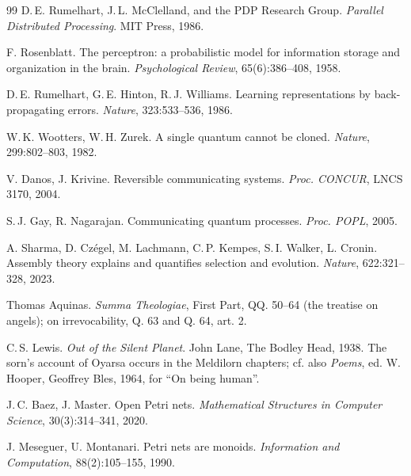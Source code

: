 \documentclass[11pt,a4paper]{article}
\begin{document}
\begin{thebibliography}{99}
 D.\,E. Rumelhart, J.\,L. McClelland, and the PDP Research Group.
\emph{Parallel Distributed Processing}. MIT Press, 1986.

 F. Rosenblatt. The perceptron: a probabilistic model for
information storage and organization in the brain. \emph{Psychological Review},
65(6):386--408, 1958.

 D.\,E. Rumelhart, G.\,E. Hinton, R.\,J. Williams. Learning
representations by back-propagating errors. \emph{Nature}, 323:533--536, 1986.

 W.\,K. Wootters, W.\,H. Zurek. A single quantum cannot be
cloned. \emph{Nature}, 299:802--803, 1982.

 V. Danos, J. Krivine. Reversible communicating systems.
\emph{Proc. CONCUR}, LNCS 3170, 2004.

 S.\,J. Gay, R. Nagarajan. Communicating quantum processes.
\emph{Proc. POPL}, 2005.

 A. Sharma, D. Czégel, M. Lachmann, C.\,P. Kempes, S.\,I.
Walker, L. Cronin. Assembly theory explains and quantifies selection and
evolution. \emph{Nature}, 622:321--328, 2023.

 Thomas Aquinas. \emph{Summa Theologiae}, First Part, QQ.
50--64 (the treatise on angels); on irrevocability, Q. 63 and Q. 64, art. 2.

 C.\,S. Lewis. \emph{Out of the Silent Planet}. John Lane,
The Bodley Head, 1938. The sorn's account of Oyarsa occurs in the Meldilorn
chapters; cf. also \emph{Poems}, ed. W. Hooper, Geoffrey Bles, 1964, for ``On
being human''.

 J.\,C. Baez, J. Master. Open Petri nets. \emph{Mathematical
Structures in Computer Science}, 30(3):314--341, 2020.

 J. Meseguer, U. Montanari. Petri nets are monoids.
\emph{Information and Computation}, 88(2):105--155, 1990.

\end{thebibliography}
\end{document}
